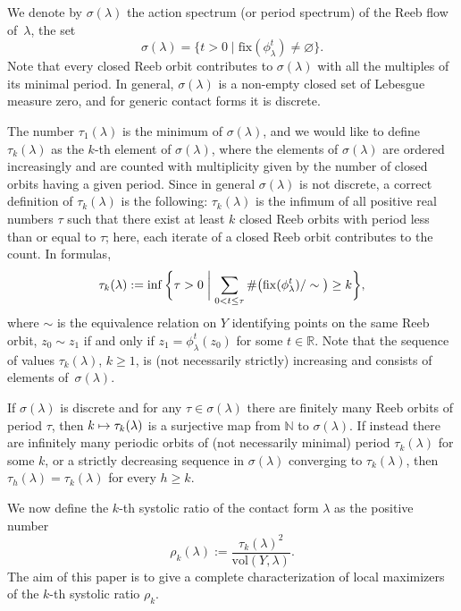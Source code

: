 \documentclass[JEP,XML,SOM,Unicode,published]{cedram}
\let\mathds\mathbb
\newcommand\mto{\mathchoice{\longmapsto}{\mapsto}{\mapsto}{\mapsto}}
\theoremstyle{definition}
\newcommand{\vol}{\mathrm{vol}}
\newcommand{\fix}{\mathrm{fix}}
\newcommand{\N}{\mathds{N}}
\newcommand{\R}{\mathds{R}}
\begin{document}
We denote by $\sigma(\lambda)$ the action spectrum (or period spectrum) of the Reeb flow of~$\lambda$, \ie the set
\[
\sigma(\lambda)=\big\{t>0\mid \fix(\phi_\lambda^t)\neq\varnothing\big\}.
\]
Note that every closed Reeb orbit contributes to $\sigma(\lambda)$ with all the multiples of its minimal period. In general, $\sigma(\lambda)$ is a non-empty closed set of Lebesgue measure zero, and for generic contact forms it is discrete.

The number $\tau_1(\lambda)$ is the minimum of $\sigma(\lambda)$, and we would like to define $\tau_k(\lambda)$ as the $k$-th element of $\sigma(\lambda)$, where the elements of $\sigma(\lambda)$ are ordered increasingly and are counted with multiplicity given by the number of closed orbits having a given period. Since in general $\sigma(\lambda)$ is not discrete, a correct definition of $\tau_k(\lambda)$ is the following: $\tau_k(\lambda)$ is the infimum of all positive real numbers $\tau$ such that there exist at least $k$ closed Reeb orbits with period less than or equal to $\tau$; here, each iterate of a closed Reeb orbit contributes to the count. In formulas,
\begin{equation}
\label{e:tau_k}
\tau_k(\lambda):=\inf\bigg\{\tau>0 \biggm| \sum_{0<t\leq\tau} \#\big(\fix(\phi_\lambda^t)/\sim\big)\geq k \bigg\},
\end{equation}
where $\sim$ is the equivalence relation on $Y$ identifying points on the same Reeb orbit, \ie $z_0\sim z_1$ if and only if $z_1=\phi_\lambda^t(z_0)$ for some $t\in\R$. Note that the sequence of values $\tau_k(\lambda)$, $k\geq1$, is (not necessarily strictly) increasing and consists of elements of~$\sigma(\lambda)$.

If $\sigma(\lambda)$ is discrete and for any $\tau \in \sigma(\lambda)$ there are finitely many Reeb orbits of period $\tau$, then $k\mto \tau_k(\lambda)$ is a surjective map from $\N$ to $\sigma(\lambda)$. If instead there are infinitely many periodic orbits of (not necessarily minimal) period $\tau_{k}(\lambda)$ for some $k$, or a strictly decreasing sequence in $\sigma(\lambda)$ converging to $\tau_{k}(\lambda)$, then $\tau_h(\lambda)=\tau_{k}(\lambda)$ for every $h\geq k$.

We now define the $k$-th systolic ratio of the contact form $\lambda$ as the positive number
\[
\rho_k(\lambda) := \frac{\tau_k(\lambda)^2}{\vol(Y,\lambda)}.
\]
The aim of this paper is to give a complete characterization of local maximizers of the $k$-th systolic ratio $\rho_k$.
\end{document}
